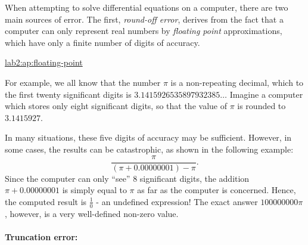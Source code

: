 When attempting to solve differential
equations on a computer, there 
are two main sources of error.  The first, \emph{ round-off error},
derives from the fact that a computer can only
represent real numbers by \emph{ floating point} 
approximations, which
have only a finite number of digits of accuracy.
\begin{latexonly}
\end{latexonly}

\begin{mathnote}
      \hyperref{Floating point representation of numbers.}{See Appendix }{ for a
      description of floating point representation of
      numbers.}{lab2:ap:floating-point} 
\end{mathnote}

\begin{example}
  For example, we all know that the number $\pi$ is a non-repeating
  decimal, which to the first twenty significant digits is
  $3.1415926535897932385\dots$
  Imagine a computer which stores only eight significant digits, so that
  the value of $\pi$ is rounded to $3.1415927$.
  
  In many situations, these five digits of accuracy may be sufficient.
  However, in some cases, the results can be catastrophic, as shown in
  the following example:
  \[
    \frac{\pi}{(\pi + 0.00000001)-\pi}. 
  \]
  Since the computer can only ``see'' 8 significant digits, the addition
  $\pi+0.00000001$ is simply equal to $\pi$ as far as the computer is
  concerned. 
  Hence, the computed result is $\frac{1}{0}$ - an undefined expression!
  The exact answer $100000000\pi$, however, is a very well-defined
  non-zero value.   
\end{example}

\paragraph{Truncation error:}

